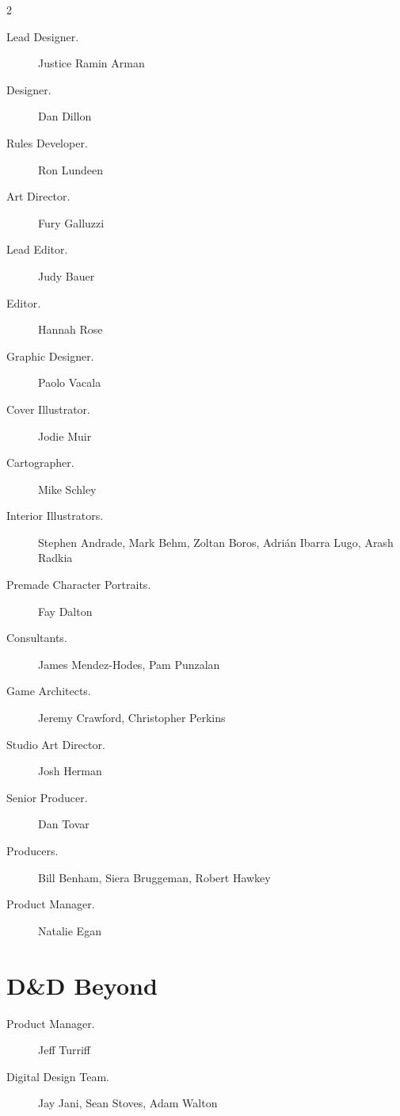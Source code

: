 \documentclass[10pt,a4paper,twoside,bg=print,twocolumn,openany,nodeprecatedcode]{dndbook}
\begin{document}
\begin{description}
\begin{multicols}{2}

\begin{description}
\item[Lead Designer.]
Justice Ramin Arman

\item[Designer.]
Dan Dillon

\item[Rules Developer.]
Ron Lundeen

\item[Art Director.]
Fury Galluzzi

\item[Lead Editor.]
Judy Bauer

\item[Editor.]
Hannah Rose

\item[Graphic Designer.]
Paolo Vacala

\item[Cover Illustrator.]
Jodie Muir

\item[Cartographer.]
Mike Schley

\item[Interior Illustrators.]
Stephen Andrade, Mark Behm, Zoltan Boros, Adrián Ibarra Lugo, Arash Radkia

\item[Premade Character Portraits.]
Fay Dalton

\item[Consultants.]
James Mendez-Hodes, Pam Punzalan

\item[Game Architects.]
Jeremy Crawford, Christopher Perkins

\item[Studio Art Director.]
Josh Herman

\item[Senior Producer.]
Dan Tovar

\item[Producers.]
Bill Benham, Siera Bruggeman, Robert Hawkey

\item[Product Manager.]
Natalie Egan

\end{description}

\section{D\&D Beyond}

\begin{description}
\item[Product Manager.]
Jeff Turriff

\item[Digital Design Team.]
Jay Jani, Sean Stoves, Adam Walton

\end{description}

\end{multicols}

\end{description}
\end{document}
